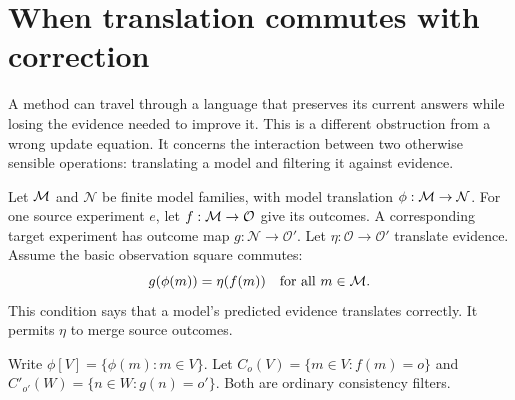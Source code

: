 \section{When translation commutes with correction}\label{MU:sec:correctiontransport}
A method can travel through a language that preserves its current answers while losing the evidence needed to improve it. This is a different obstruction from a wrong update equation. It concerns the interaction between two otherwise sensible operations: translating a model and filtering it against evidence.

Let $\mathcal M$ and $\mathcal N$ be finite model families, with model translation $\phi:\mathcal M\to\mathcal N$. For one source experiment $e$, let $f:\mathcal M\to\mathcal O$ give its outcomes. A corresponding target experiment has outcome map $g:\mathcal N\to\mathcal O'$. Let $\eta:\mathcal O\to\mathcal O'$ translate evidence. Assume the basic observation square commutes:
\begin{equation}\label{MU:eq:evidence-square}
g(\phi(m))=\eta(f(m))\quad\text{for all }m\in\mathcal M.
\end{equation}
This condition says that a model's predicted evidence translates correctly. It permits $\eta$ to merge source outcomes.

Write $\phi[V]=\{\phi(m):m\in V\}$. Let $C_o(V)=\{m\in V:f(m)=o\}$ and $C'_{o'}(W)=\{n\in W:g(n)=o'\}$. Both are ordinary consistency filters.

